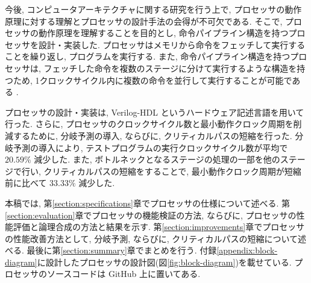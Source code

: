 \documentclass[../main.tex]{subfiles}
\begin{document}
  今後, コンピュータアーキテクチャに関する研究を行う上で, 
  プロセッサの動作原理に対する理解とプロセッサの設計手法の会得が不可欠である.
  そこで, プロセッサの動作原理を理解することを目的とし, 
  命令パイプライン構造を持つプロセッサを設計・実装した.
  プロセッサはメモリから命令をフェッチして実行することを繰り返し, プログラムを実行する.
  また, 命令パイプライン構造を持つプロセッサは, 
  フェッチした命令を複数のステージに分けて実行するような構造を持つため, 
  1クロックサイクル内に複数の命令を並行して実行することが可能である \cite{ca-quantitative-approach}.

  プロセッサの設計・実装は, Verilog-HDL というハードウェア記述言語を用いて行った.
  さらに, プロセッサのクロックサイクル数と最小動作クロック周期を削減するために, 
  分岐予測の導入, ならびに, クリティカルパスの短縮を行った.
  分岐予測の導入により, テストプログラムの実行クロックサイクル数が平均で $20.59\%$ 減少した.
  また, ボトルネックとなるステージの処理の一部を他のステージで行い, 
  クリティカルパスの短縮をすることで, 
  最小動作クロック周期が短縮前に比べて $33.33\%$ 減少した.

  本稿では, 第\ref{section:specifications}章でプロセッサの仕様について述べる.
  第\ref{section:evaluation}章でプロセッサの機能検証の方法, ならびに, プロセッサの性能評価と論理合成の方法と結果を示す.
  第\ref{section:improvements}章でプロセッサの性能改善方法として, 分岐予測, ならびに, クリティカルパスの短縮について述べる.
  最後に第\ref{section:summary}章でまとめを行う.
  付録\ref{appendix:block-diagram}に設計したプロセッサの設計図(図\ref{fig:block-diagram})を載せている.
  プロセッサのソースコードは GitHub \footnotemark 上に置いてある.
\end{document}
